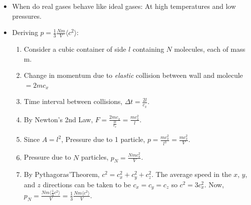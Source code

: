 \documentclass[oneside]{book}
\begin{document}
\begin{itemize}
\begin{tabular}{|Sc|Sl|}
\begin{tabular}{@{}Sl@{}}
        \end{tabular}\\
        \hline
        \textbf{V} & 
        \begin{tabular}{@{}Sl@{}}
        The volume of the gas molecules themselves is negligible \\compared to the volume of the container.
        \end{tabular}\\
        \hline
    \end{tabular}
    \item When do real gases behave like ideal gases: At high temperatures and low pressures.
    \item Deriving \(p=\frac{1}{3}\frac{Nm}{V}\langle c^2 \rangle\):
    \begin{enumerate}
        \item Consider a cubic container of side \(l\) containing \(N\) molecules, each of mass m.
        \item Change in momentum due to \emph{elastic} collision between wall and molecule\(\text{}=2mc_x\)
        \item Time interval between collisions, \(\Delta t=\frac{2l}{c_x}\).
        \item By Newton's 2nd Law, \(F=\frac{2mc_x}{\frac{2l}{c_x}}=\frac{mc_x^2}{l}\).
        \item Since \(A=l^2\), Pressure due to 1 particle, \(p=\frac{mc_x^2}{l^3}=\frac{mc_x^2}{V}\).
        \item Pressure due to \(N\) particles, \(p_N=\frac{Nmc_x^2}{V}\).
        \item By Pythagoras'Theorem, \(c^2=c_x^2+c_y^2+c_z^2\). The average speed in the \(x\), \(y\), and \(z\) directions can be taken to be \(c_x=c_y=c_z\) so \(c^2=3c_x^2\). Now, \(p_N=\frac{Nm\langle \frac{1}{3}c^2\rangle}{V}=\frac{1}{3}\frac{Nm\langle c^2 \rangle}{V}\).
    \end{enumerate}
\end{itemize}
\end{document}
